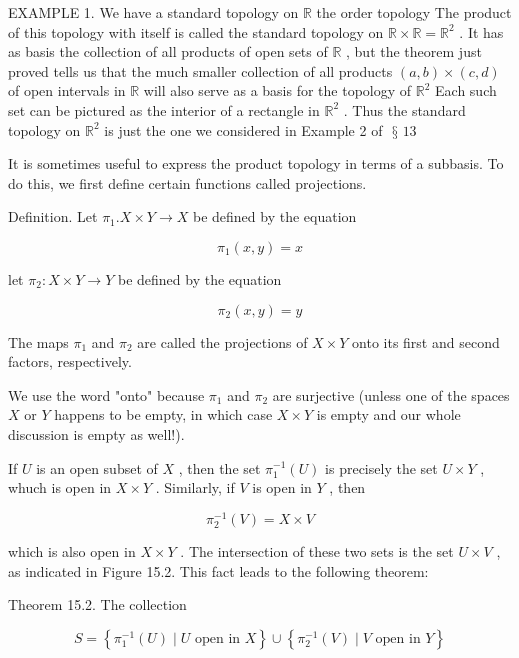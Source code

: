 \documentclass[10pt]{article}
\begin{document}
EXAMPLE 1. We have a standard topology on \(\mathbb{R}\) the order topology The product of this topology with itself is called the standard topology on \(\mathbb{R} \times  \mathbb{R} = {\mathbb{R}}^{2}\) . It has as basis the collection of all products of open sets of \(\mathbb{R}\) , but the theorem just proved tells us that the much smaller collection of all products \(\left( {a,b}\right)  \times  \left( {c,d}\right)\) of open intervals in \(\mathbb{R}\) will also serve as a basis for the topology of \({\mathbb{R}}^{2}\) Each such set can be pictured as the interior of a rectangle in \({\mathbb{R}}^{2}\) . Thus the standard topology on \({\mathbb{R}}^{2}\) is just the one we considered in Example 2 of \(\text{ § }{13}\)

It is sometimes useful to express the product topology in terms of a subbasis. To do this, we first define certain functions called projections.

Definition. Let \({\pi }_{1}.X \times  Y \rightarrow  X\) be defined by the equation

\[
{\pi }_{1}\left( {x,y}\right)  = x
\]

let \({\pi }_{2} : X \times  Y \rightarrow  Y\) be defined by the equation

\[
{\pi }_{2}\left( {x,y}\right)  = y
\]

The maps \({\pi }_{1}\) and \({\pi }_{2}\) are called the projections of \(X \times  Y\) onto its first and second factors, respectively.

We use the word "onto" because \({\pi }_{1}\) and \({\pi }_{2}\) are surjective (unless one of the spaces \(X\) or \(Y\) happens to be empty, in which case \(X \times  Y\) is empty and our whole discussion is empty as well!).

If \(U\) is an open subset of \(X\) , then the set \({\pi }_{1}^{-1}\left( U\right)\) is precisely the set \(U \times  Y\) , whuch is open in \(X \times  Y\) . Similarly, if \(V\) is open in \(Y\) , then

\[
{\pi }_{2}^{-1}\left( V\right)  = X \times  V
\]

which is also open in \(X \times  Y\) . The intersection of these two sets is the set \(U \times  V\) , as indicated in Figure 15.2. This fact leads to the following theorem:

Theorem 15.2. The collection

\[
S = \left\{  {{\pi }_{1}^{-1}\left( U\right)  \mid  U\text{ open in }X}\right\}   \cup  \left\{  {{\pi }_{2}^{-1}\left( V\right)  \mid  V\text{ open in }Y}\right\}
\]
\end{document}
